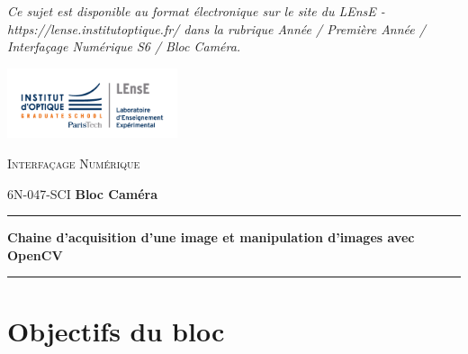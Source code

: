 \documentclass[a4paper,11pt,titlepage]{article} %
\begin{document}
\begin{titlepage}
\begin{center}
\bigskip

\vfill

\textit{Ce sujet est disponible au format électronique sur le site du LEnsE - https://lense.institutoptique.fr/ dans la rubrique Année / Première Année / Interfaçage Numérique S6 / Bloc Caméra.}


\end{center}
\end{titlepage}

\newpage
\strut %


\newpage
\pagestyle{empty}

\begin{minipage}[c]{.25\linewidth}
	\includegraphics[width=5cm]{images/Logo-LEnsE.png}
\end{minipage} \hfill
\begin{minipage}[c]{.4\linewidth}

\begin{center}
\vspace{0.3cm}
{\Large \textsc{Interfaçage Numérique}}

\medskip

6N-047-SCI \qquad \textbf{\Large Bloc Caméra}

\end{center}
\end{minipage}\hfill

\vspace{0.5cm}

\noindent \rule{\linewidth}{1pt}

{\noindent\Large  \rule[-7pt]{0pt}{30pt} \textbf{Chaine d'acquisition d'une image et manipulation d'images avec OpenCV}}

\noindent \rule{\linewidth}{1pt}

\bigskip


\section{Objectifs du bloc}
\end{document}
